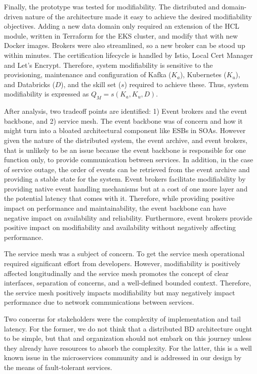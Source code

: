 \documentclass[a4paper,11pt]{article}
\begin{document}
Finally, the prototype was tested for modifiability. The distributed and domain-driven nature of the architecture made it easy to achieve the desired modifiability objectives. Adding a new data domain only required an extension of the HCL module, written in Terraform for the EKS cluster, and modify that with new Docker images. Brokers were also streamlined, so a new broker can be stood up within minutes. The certification lifecycle is handled by Istio, Local Cert Manager and Let's Encrypt. Therefore, system modifiability is sensitive to the provisioning, maintenance and configuration of Kafka ($K_a$), Kubernetes ($K_u$), and Databricks ($D$), and the skill set ($s$) required to achieve these. Thus, system modifiability is expressed as $Q_M = s(K_a, K_u, D)$. 

After analysis, two tradeoff points are identified: 1) Event brokers and the event backbone, and 2) service mesh. The event backbone was of concern and how it might turn into a bloated architectural component like ESBs in SOAs. However given the nature of the distributed system, the event archive, and event brokers, that is unlikely to be an issue because the event backbone is responsible for one function only, to provide communication between services. In addition, in the case of service outage, the order of events can be retrieved from the event archive and providing a stable state for the system. Event brokers facilitate modifiability by providing native event handling mechanisms but at a cost of one more layer and the potential latency that comes with it. Therefore, while providing positive impact on performance and maintainability, the event backbone can have negative impact on availability and reliability. Furthermore, event brokers provide positive impact on modifiability and availability without negatively affecting performance. 

The service mesh was a subject of concern. To get the service mesh operational required significant effort from developers. However, modifiability is positively affected longitudinally and the service mesh promotes the concept of clear interfaces, separation of concerns, and a well-defined bounded context. Therefore, the service mesh positively impacts modifiability but may negatively impact performance due to network communications between services. 
 
Two concerns for stakeholders were the complexity of implementation and tail latency. For the former, we do not think that a distributed BD architecture ought to be simple, but that and organization should not embark on this journey unless they already have resources to absorb the complexity. For the latter, this is a well known issue in the microservices community and is addressed in our design by the means of fault-tolerant services.  
\end{document}
